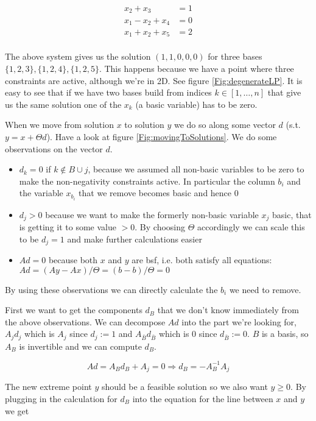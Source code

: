 \begin{align*}
x_2 + x_3 &= 1\\
x_1 - x_2 +x_4 &=0\\
x_1 + x_2 +x_5 &= 2\\
\end{align*}


The above system gives us the solution $(1,1,0,0,0)$ for three bases $\{1,2,3\},\{1,2,4\},\{1,2,5\}$. This happens because we have a point where three constraints are active, although we're in 2D. See figure \ref{Fig:degenerateLP}. It is easy to see that if we have two bases build from indices $k\in [1,\ldots,n]$ that give us the same solution one of the $x_k$ (a basic variable) has to be zero. %


When we move from solution $x$ to solution $y$ we do so along some vector $d$ (s.t. $y=x+\Theta d$). Have a look at figure \ref{Fig:movingToSolutions}. We do some observations on the vector $d$. 

\begin{itemize}
\item $d_k=0$ if $k\not \in B \cup j$, because we assumed all non-basic variables to be zero to make the non-negativity constraints active. In particular the column $b_i$ and the variable $x_{b_i}$ that we remove becomes basic and hence 0
\item $d_j>0$ because we want to make the formerly non-basic variable $x_j$ basic, that is getting it to some value $>0$. By choosing $\Theta$ accordingly we can scale this to be $d_j=1$ and make further calculations easier
\item $Ad = 0$ because both $x$ and $y$ are bsf, i.e. both satisfy all equations: $Ad = (Ay-Ax)/\Theta = (b-b)/\Theta = 0$
\end{itemize}

By using these observations we can directly calculate the $b_i$ we need to remove.

First we want to get the components $d_B$ that we don't know immediately from the above observations. We can decompose $Ad$ into the part we're looking for, $A_j d_j$ which is $A_j$ since $d_j:=1$ and $A_{\bar B} d_{\bar B}$ which is 0 since $d_{\bar B}:=0$. $B$ is a basis, so $A_B$ is invertible and we can compute $d_B$.

\[Ad = A_B d_B+A_j = 0 \Rightarrow d_B = -A^{-1}_B A_j\]

The new extreme point $y$ should be a feasible solution so we also want $y\geq 0$. By plugging in the calculation for $d_B$ into the equation for the line between $x$ and $y$ %
we get

